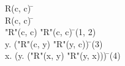 \documentclass{article}
\begin{document}
\begin{proofbox}
\open
\: R(c, c) \= \asm \\
\: R(c, c) \=  \\
\close
\: "R"(c, c) \rightarrow "R"(c, c) \= \impliesintro(1, 2) \\
\: \exists y. ("R"(c, y) \rightarrow "R"(y, c)) \= \existsintro(3) \\
\: \exists x. (\exists y. ("R"(x, y) \rightarrow "R"(y, x))) \= \existsintro(4) \\
\end{proofbox}
\end{document}
